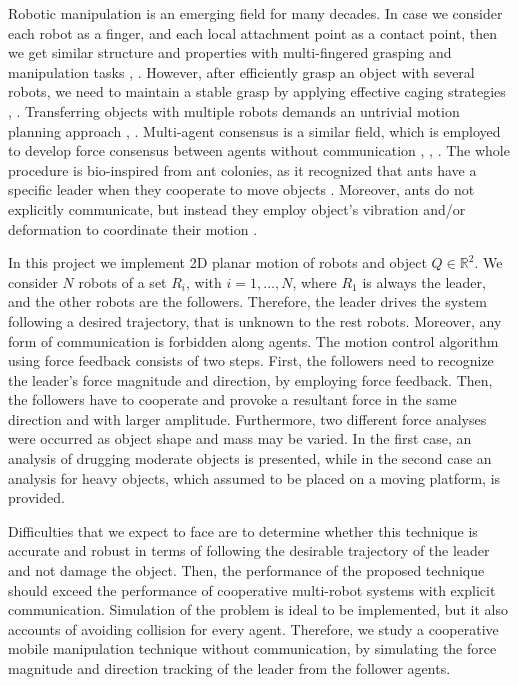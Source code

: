 \documentclass[letterpaper, 10 pt, conference]{ieeeconf}
\begin{document}
Robotic manipulation is an emerging field for many decades. In case we consider each robot as a finger, and each local attachment point as a contact point, then we get similar structure and properties with multi-fingered grasping and manipulation tasks \cite{murray1994mathematical}, \cite{prattichizzo2016grasping}. However, after efficiently grasp an object with several robots, we need to maintain a stable grasp by applying effective caging strategies \cite{fink2008multi}, \cite{pereira2004decentralized}. Transferring objects with multiple robots demands an untrivial motion planning approach \cite{donald1997information}, \cite{rus1995moving}. Multi-agent consensus is a similar field, which is employed to develop force consensus between agents without communication \cite{jadbabaie2003coordination}, \cite{olfati2007consensus}, \cite{ren2005consensus}. The whole procedure is bio-inspired from ant colonies, as it recognized that ants have a specific leader when they cooperate to move objects \cite{gelblum2015ant}. Moreover, ants do not explicitly communicate, but instead they employ object's vibration and/or deformation to coordinate their motion \cite{mccreery2014cooperative}. 

In this project we implement 2D planar motion of robots and object $Q \in \mathbb{R}^2$. We consider $N$ robots of a set $R_i$, with $i=1, \hdots ,N$, where $R_1$ is always the leader, and the other robots are the followers. Therefore, the leader drives the system following a desired trajectory, that is unknown to the rest robots. Moreover, any form of communication is forbidden along agents. The motion control algorithm using force feedback consists of two steps. First, the followers need to recognize the leader's force magnitude and direction, by employing force feedback. Then, the followers have to cooperate and provoke a resultant force in the same direction and with larger amplitude.  Furthermore, two different force analyses were occurred as object shape and mass may be varied. In the first case, an analysis of drugging moderate objects is presented, while in the second case an analysis for heavy objects, which assumed to be placed on a moving platform, is provided. 

Difficulties that we expect to face are to determine whether this technique is accurate and robust in terms of following the desirable trajectory of the leader and not damage the object. Then, the performance of the proposed technique should exceed the performance of cooperative multi-robot systems with explicit communication. Simulation of the problem is ideal to be implemented, but it also accounts of avoiding collision for every agent. Therefore, we study a cooperative mobile manipulation technique without communication, by simulating the force magnitude and direction tracking of the leader from the follower agents.



\end{document}
